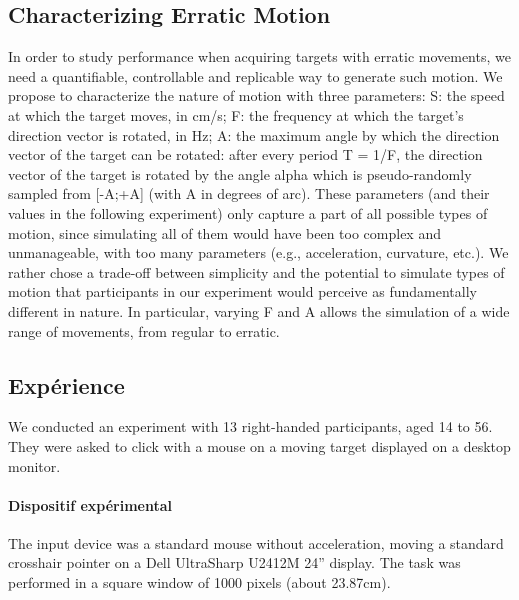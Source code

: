 \subsection{Characterizing Erratic Motion}
In order to study performance when acquiring targets with erratic movements, we
need a quantifiable, controllable and replicable way to generate such motion. We
propose to characterize the nature of motion with three parameters:
 S: the speed at which the target moves, in cm/s;
 F: the frequency at which the target's direction vector is rotated, in Hz;
 A: the maximum angle by which the direction vector of the target can be rotated:
after every period T = 1/F, the direction vector of the target is rotated by the angle
alpha which is pseudo-randomly sampled from [-A;+A] (with A in degrees of arc).
These parameters (and their values in the following experiment) only capture a part
of all possible types of motion, since simulating all of them would have been too
complex and unmanageable, with too many parameters (e.g., acceleration, curvature,
etc.). We rather chose a trade-off between simplicity and the potential to simulate
types of motion that participants in our experiment would perceive as fundamentally
different in nature. In particular, varying F and A allows the simulation of a wide
range of movements, from regular to erratic.

\subsection{Expérience}
We conducted an experiment with 13 right-handed participants, aged 14 to 56. They
were asked to click with a mouse on a moving target displayed on a desktop monitor.

\paragraph{Dispositif expérimental}
The input device was a standard mouse without acceleration, moving a
standard crosshair pointer on a Dell UltraSharp U2412M 24” display. The task was
performed in a square window of 1000 pixels (about 23.87cm).

